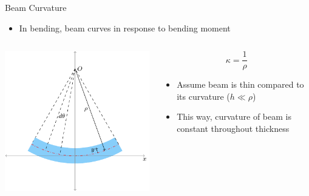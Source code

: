\documentclass[10pt, svgnames]{beamer}
\begin{document}
\begin{frame}[label={sec:org57cddf7}]{Beam Curvature}
\begin{itemize}
\item In bending, beam curves in response to bending moment
\end{itemize}

\begin{columns}
\begin{column}{0.6\columnwidth}
\begin{center}
\includegraphics[width=.9\linewidth]{pictures/beam-curvature.pdf}
\end{center}
\end{column}

\begin{column}{0.4\columnwidth}
\[\kappa = \frac{1}{\rho}\]

\begin{itemize}
\item Assume beam is thin compared to its curvature (\(h \ll \rho\))

\item This way, curvature of beam is constant throughout thickness
\end{itemize}
\end{column}
\end{columns}
\end{frame}
\end{document}
